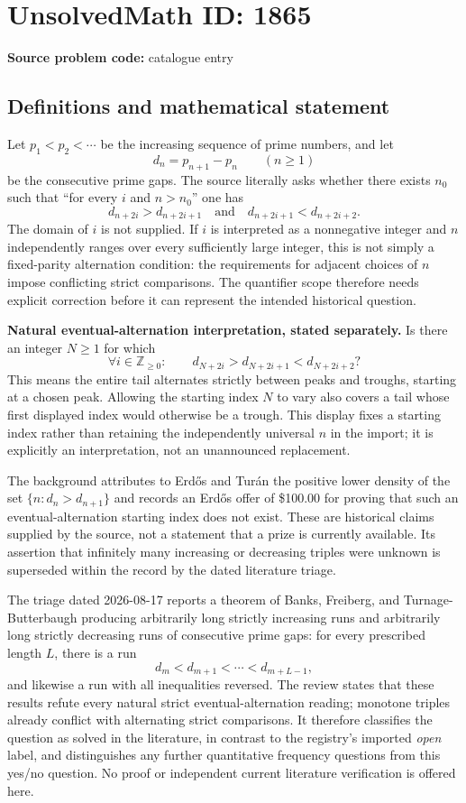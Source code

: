 \documentclass[11pt]{article}
\newcommand{\Z}{\mathbb{Z}}
\begin{document}
\section*{UnsolvedMath ID: 1865}
\textbf{Source problem code:} catalogue entry
\subsection{Definitions and mathematical statement}
Let $p_1<p_2<\cdots$ be the increasing sequence of prime numbers, and let
\[
 d_n=p_{n+1}-p_n\qquad(n\geq1)
\]
be the consecutive prime gaps. The source literally asks whether there exists $n_0$ such that ``for every $i$ and $n>n_0$'' one has
\[
 d_{n+2i}>d_{n+2i+1}\quad\text{and}\quad
 d_{n+2i+1}<d_{n+2i+2}.
\]
The domain of $i$ is not supplied. If $i$ is interpreted as a nonnegative integer and $n$ independently ranges over every sufficiently large integer, this is not simply a fixed-parity alternation condition: the requirements for adjacent choices of $n$ impose conflicting strict comparisons. The quantifier scope therefore needs explicit correction before it can represent the intended historical question.

\textbf{Natural eventual-alternation interpretation, stated separately.} Is there an integer $N\geq1$ for which
\[
 \forall i\in\Z_{\geq0}:\qquad
 d_{N+2i}>d_{N+2i+1}<d_{N+2i+2}?
\]
This means the entire tail alternates strictly between peaks and troughs, starting at a chosen peak. Allowing the starting index $N$ to vary also covers a tail whose first displayed index would otherwise be a trough. This display fixes a starting index rather than retaining the independently universal $n$ in the import; it is explicitly an interpretation, not an unannounced replacement.

The background attributes to Erdős and Turán the positive lower density of the set $\{n:d_n>d_{n+1}\}$ and records an Erdős offer of \$100.00 for proving that such an eventual-alternation starting index does not exist. These are historical claims supplied by the source, not a statement that a prize is currently available. Its assertion that infinitely many increasing or decreasing triples were unknown is superseded within the record by the dated literature triage.

The triage dated 2026-08-17 reports a theorem of Banks, Freiberg, and Turnage-Butterbaugh producing arbitrarily long strictly increasing runs and arbitrarily long strictly decreasing runs of consecutive prime gaps: for every prescribed length $L$, there is a run
\[
 d_m<d_{m+1}<\cdots<d_{m+L-1},
\]
and likewise a run with all inequalities reversed. The review states that these results refute every natural strict eventual-alternation reading; monotone triples already conflict with alternating strict comparisons. It therefore classifies the question as solved in the literature, in contrast to the registry's imported \emph{open} label, and distinguishes any further quantitative frequency questions from this yes/no question. No proof or independent current literature verification is offered here.
\end{document}
